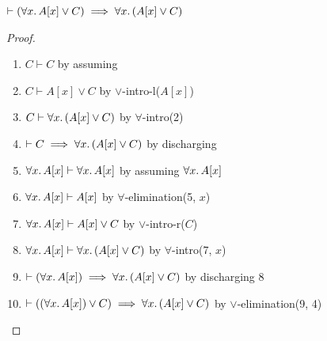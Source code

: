 \nwendcode{}\nwdocspar

\begin{node}%
$\vdash(\forall x\ldotp A[x]\lor C)\implies\forall x\ldotp(A[x]\lor C)$
\end{node}

\begin{proof}
\begin{enumerate}
\item $C\vdash C$ by assuming%
\item $C\vdash A[x]\lor C$ by $\lor$-intro-l($A[x]$)%
\item $C\vdash\forall x\ldotp(A[x]\lor C)$ by $\forall$-intro(2)%
\item $\vdash C\implies\forall x\ldotp(A[x]\lor C)$ by discharging%
\item $\forall x\ldotp A[x]\vdash\forall x\ldotp A[x]$ by assuming $\forall x\ldotp A[x]$%
\item $\forall x\ldotp A[x]\vdash A[x]$ by $\forall$-elimination(5, $x$)%
\item $\forall x\ldotp A[x]\vdash A[x]\lor C$ by $\lor$-intro-r($C$)%
\item $\forall x\ldotp A[x]\vdash\forall x\ldotp(A[x]\lor C)$ by
  $\forall$-intro(7, $x$)%
\item $\vdash(\forall x\ldotp A[x])\implies\forall x\ldotp(A[x]\lor C)$ by
  discharging 8%
\item $\vdash((\forall x\ldotp A[x])\lor C)\implies\forall x\ldotp(A[x]\lor C)$
  by $\lor$-elimination(9, 4)\qedhere
\end{enumerate}
\end{proof}

